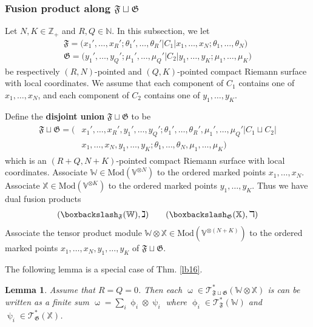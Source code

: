 \documentclass[11pt,b5paper,notitlepage]{article}
\theoremstyle{definition}
\theoremstyle{plain}
\newtheorem{lm}[df]{Lemma}
\newcommand{\fk}{\mathfrak}
\newcommand{\Vbb}{\mathbb V}
\newcommand{\Xbb}{\mathbb X}
\newcommand{\Wbb}{\mathbb W}
\newcommand{\Nbb}{\mathbb N}
\newcommand{\Zbb}{\mathbb Z}
\newcommand{\<}{\left\langle}
\renewcommand{\>}{\right\rangle}
\newcommand{\ST}{\mathscr{T}}
\newcommand{\bbs}{\boxbackslash}
\newcommand{\Mod}{\mathrm{Mod}}
\newcommand{\ff}{\mathfrak{F}}
\newcommand{\fg}{\mathfrak{G}}
\numberwithin{equation}{section}
\begin{document}
\subsubsection{Fusion product along $\fk F\sqcup\fk G$}\label{lb41}


Let $N,K\in\Zbb_+$ and $R,Q\in\Nbb$. In this subsection, we let 
\begin{gather*}
    \fk F=\big(x_1',\dots,x_R'; \theta_1',\dots,\theta_R'\big|C_1\big|x_1,\dots,x_N;\theta_1,\dots,\theta_N\big)\\
    \fk G=\big(y_1',\dots,y_Q';\mu_1',\dots,\mu_Q'\big|C_2\big| y_1,\dots,y_K;\mu_1,\dots,\mu_K \big)
    \end{gather*}
be respectively $(R,N)$-pointed and $(Q,K)$-pointed compact Riemann surface with local coordinates. We assume that each component of $C_1$ contains one of $x_1,\dots,x_N$, and each component of $C_2$ contains one of $y_1,\dots,y_K$.

Define the \textbf{disjoint union} $\ff\sqcup\fg$ to be
\begin{align}\label{eq86}
\begin{aligned}
    \fk F\sqcup \fk G=\big(&x_1',\dots,x_R',y_1',\dots,y_Q'; \theta_1',\dots,\theta_R',\mu_1',\dots,\mu_Q'\big|C_1\sqcup C_2
    \big|\\
    &x_1,\dots,x_N, y_1,\dots,y_K;\theta_1,\dots,\theta_N,\mu_1,\dots,\mu_K\big)
\end{aligned}
\end{align}
which is an $(R+Q,N+K)$-pointed compact Riemann surface with local coordinates. Associate $\Wbb\in\Mod(\Vbb^{\otimes N})$ to the ordered marked points $x_1,\dots,x_N$. Associate  $\Xbb\in\Mod(\Vbb^{\otimes K})$ to the ordered marked points $y_1,\dots,y_K$. Thus we have dual fusion products
\begin{align*}
(\bbs_\ff(\Wbb),\gimel)\qquad (\bbs_\fg(\Xbb),\daleth)
\end{align*}
Associate the tensor product module $\Wbb\otimes \Xbb\in\Mod(\Vbb^{\otimes(N+K)})$ to the ordered marked points $x_1,\dots,x_N,y_1,\dots,y_K$ of $\ff\sqcup\fg$. 


The following lemma is a special case of Thm. \ref{lb16}.

\begin{lm}\label{lb17}
Assume that $R=Q=0$. Then each $\upomega\in\ST^*_{\ff\sqcup\fg}(\Wbb\otimes\Xbb)$ is can be written as a finite sum $\upomega=\sum_i \upphi_i\otimes\uppsi_i$ where $\upphi_i\in\ST^*_\ff(\Wbb)$ and $\uppsi_i\in\ST^*_\fg(\Xbb)$.
\end{lm}
\end{document}
